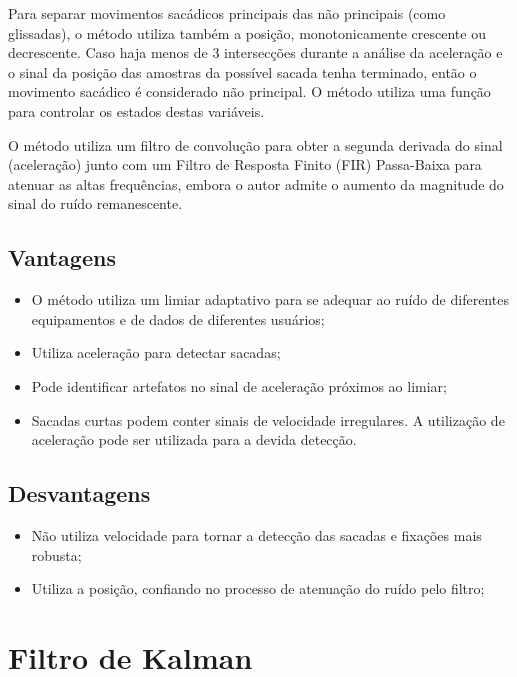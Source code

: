\documentclass[brazil,]{report}
\begin{document}
Para separar movimentos sacádicos principais das não principais (como
glissadas), o método utiliza também a posição, monotonicamente crescente
ou decrescente. Caso haja menos de 3 intersecções durante a análise da
aceleração e o sinal da posição das amostras da possível sacada tenha
terminado, então o movimento sacádico é considerado não principal. O
método utiliza uma função para controlar os estados destas variáveis.

O método utiliza um filtro de convolução para obter a segunda derivada
do sinal (aceleração) junto com um Filtro de Resposta Finito (FIR)
Passa-Baixa para atenuar as altas frequências, embora o autor admite o
aumento da magnitude do sinal do ruído remanescente.

\subsection{Vantagens}\label{vantagens-9}

\begin{itemize}
\itemsep1pt\parskip0pt
\item
  O método utiliza um limiar adaptativo para se adequar ao ruído de
  diferentes equipamentos e de dados de diferentes usuários;
\item
  Utiliza aceleração para detectar sacadas;
\item
  Pode identificar artefatos no sinal de aceleração próximos ao limiar;
\item
  Sacadas curtas podem conter sinais de velocidade irregulares. A
  utilização de aceleração pode ser utilizada para a devida detecção.
\end{itemize}

\subsection{Desvantagens}\label{desvantagens-9}

\begin{itemize}
\itemsep1pt\parskip0pt
\item
  Não utiliza velocidade para tornar a detecção das sacadas e fixações
  mais robusta;
\item
  Utiliza a posição, confiando no processo de atenuação do ruído pelo
  filtro;
\end{itemize}

\section{Filtro de Kalman}\label{filtro-de-kalman-1}
\end{document}
